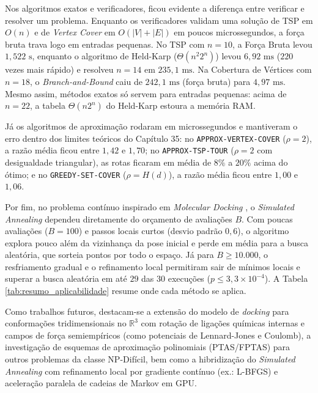 \documentclass[conference]{IEEEtran}
\theoremstyle{definition}
\theoremstyle{plain}
\begin{document}
Nos algoritmos exatos e verificadores, ficou evidente a diferença entre verificar e resolver um problema. Enquanto os verificadores validam uma solução de TSP em $O(n)$ e de \textit{Vertex Cover} em $O(|V| + |E|)$ em poucos microssegundos, a força bruta trava logo em entradas pequenas. No TSP com $n = 10$, a Força Bruta levou $1{,}522\text{ s}$, enquanto o algoritmo de Held-Karp \cite{held1962dynamic} ($\Theta(n^2 2^n)$) levou $6{,}92\text{ ms}$ ($220$ vezes mais rápido) e resolveu $n = 14$ em $235{,}1\text{ ms}$. Na Cobertura de Vértices com $n = 18$, o \textit{Branch-and-Bound} caiu de $242{,}1\text{ ms}$ (força bruta) para $4{,}97\text{ ms}$. Mesmo assim, métodos exatos só servem para entradas pequenas: acima de $n = 22$, a tabela $\Theta(n 2^n)$ do Held-Karp estoura a memória RAM.

Já os algoritmos de aproximação rodaram em microssegundos e mantiveram o erro dentro dos limites teóricos do Capítulo 35: no \texttt{APPROX-VERTEX-COVER} ($\rho = 2$), a razão média ficou entre $1{,}42$ e $1{,}70$; no \texttt{APPROX-TSP-TOUR} ($\rho = 2$ com desigualdade triangular), as rotas ficaram em média de $8\%$ a $20\%$ acima do ótimo; e no \texttt{GREEDY-SET-COVER} ($\rho = H(d)$), a razão média ficou entre $1{,}00$ e $1{,}06$.

Por fim, no problema contínuo inspirado em \textit{Molecular Docking} \cite{pagadala2017software,huang2018comprehensive}, o \textit{Simulated Annealing} dependeu diretamente do orçamento de avaliações $B$. Com poucas avaliações ($B = 100$) e passos locais curtos (desvio padrão $0{,}6$), o algoritmo explora pouco além da vizinhança da pose inicial e perde em média para a busca aleatória, que sorteia pontos por todo o espaço. Já para $B \ge 10.000$, o resfriamento gradual e o refinamento local permitiram sair de mínimos locais e superar a busca aleatória em até $29$ das $30$ execuções ($p \le 3{,}3 \times 10^{-4}$). A Tabela \ref{tab:resumo_aplicabilidade} resume onde cada método se aplica.

Como trabalhos futuros, destacam-se a extensão do modelo de \textit{docking} para conformações tridimensionais no $\mathbb{R}^3$ com rotação de ligações químicas internas e campos de força semiempíricos (como potenciais de Lennard-Jones e Coulomb), a investigação de esquemas de aproximação polinomiais (PTAS/FPTAS) para outros problemas da classe NP-Difícil, bem como a hibridização do \textit{Simulated Annealing} com refinamento local por gradiente contínuo (ex.: L-BFGS) e aceleração paralela de cadeias de Markov em GPU.
\end{document}
